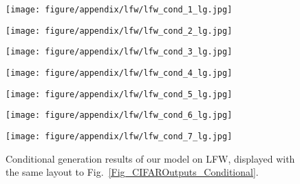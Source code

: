 \documentclass{article} \usepackage{iclr2017_conference,times}
\begin{document}
\begin{figure}[t]
\begin{minipage}{0.138\linewidth}
\center
\texttt{[image: figure/appendix/lfw/lfw\_cond\_1\_lg.jpg]}
\end{minipage}
\begin{minipage}{0.138\linewidth}
\center
\texttt{[image: figure/appendix/lfw/lfw\_cond\_2\_lg.jpg]}
\end{minipage}
\begin{minipage}{0.138\linewidth}
\center
\texttt{[image: figure/appendix/lfw/lfw\_cond\_3\_lg.jpg]}
\end{minipage}
\begin{minipage}{0.138\linewidth}
\center
\texttt{[image: figure/appendix/lfw/lfw\_cond\_4\_lg.jpg]}
\end{minipage}
\begin{minipage}{0.138\linewidth}
\center
\texttt{[image: figure/appendix/lfw/lfw\_cond\_5\_lg.jpg]}
\end{minipage}
\begin{minipage}{0.138\linewidth}
\center
\texttt{[image: figure/appendix/lfw/lfw\_cond\_6\_lg.jpg]}
\end{minipage}
\begin{minipage}{0.138\linewidth}
\center
\texttt{[image: figure/appendix/lfw/lfw\_cond\_7\_lg.jpg]}
\end{minipage}
\caption{Conditional generation results of our model on LFW, displayed with the same layout to Fig.~\ref{Fig_CIFAROutputs_Conditional}.}
\label{Fig_LFWOutputs_Conditional}
\end{figure}
 
\end{document}
